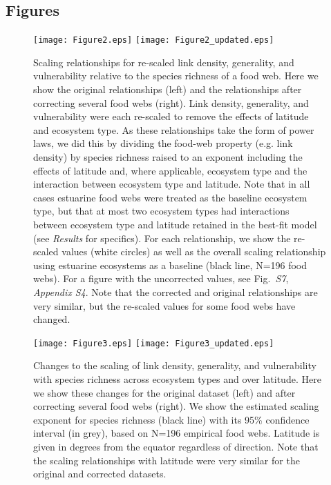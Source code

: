 \documentclass[12pt]{article}
\begin{document}
\begin{spacing}{2.0}
\clearpage

\section*{Figures}

\setcounter{figure}{1}

\begin{figure}[h]
\texttt{[image: Figure2.eps]}
\hspace{.02\textwidth}
\texttt{[image: Figure2\_updated.eps]}
\caption{Scaling relationships for re-scaled link density, generality, and vulnerability 
relative to the species richness of a food web. Here we show the original relationships (left)
and the relationships after correcting several food webs (right). Link density, generality,
and vulnerability were each re-scaled to remove the effects of latitude and ecosystem
type. As these relationships take the form of power laws, we did this by dividing the food-web
property (e.g. link density) by species richness raised to an exponent including the 
effects of latitude and, where applicable, ecosystem type and the interaction between ecosystem
type and latitude. Note that in all cases estuarine food webs were treated as the baseline 
ecosystem type, but that at most two ecosystem types had interactions between ecosystem type and
latitude retained in the best-fit model (see \emph{Results} for specifics). For each relationship, 
we show the re-scaled values (white circles) as well as the overall scaling relationship using estuarine
ecosystems as a baseline (black line, N=196 food webs). For a figure with the uncorrected values,
see Fig.~\emph{S7}, \emph{Appendix S4}. Note that the corrected and original relationships are 
very similar, but the re-scaled values for some food webs have changed.
}
\label{props_v_lat1}
\end{figure}


\begin{figure}[h]
\texttt{[image: Figure3.eps]}
\hspace{.02\textwidth}
\texttt{[image: Figure3\_updated.eps]}
\caption{Changes to the scaling of link density, generality, and vulnerability with species richness 
across ecosystem types and over latitude. Here we show these changes for the original dataset (left) 
and after correcting several food webs (right). We show the estimated scaling exponent for species 
richness (black line) with its 95\% confidence interval (in grey), based on N=196 empirical food 
webs. Latitude is given in degrees from the equator regardless of direction. Note that the scaling
relationships with latitude were very similar for the original and corrected datasets.} 
\label{S1} 
\end{figure}


\end{spacing}
\end{document}
